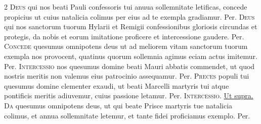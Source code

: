 \begin{multicols*}{2}
{\color{Red} }
\lettrine[lines=2]{\zallmancaps \color{Red} D}{eus} qui nos beati Pauli confessoris tui anuua sollemnitate letificas, concede propicius ut cuius natalicia colimus per eius ad te exempla gradiamur. Per.
{\color{Red} }
\lettrine[lines=2]{\zallmancaps \color{Blue} D}{eus} qui nos sanctorum tuorum Hylarii et Remigii confessionibus gloriosis circundas et protegis, da nobis et eorum imitatione proficere et intercessione gaudere. Per.
{\color{Red} }
\lettrine[lines=2]{\zallmancaps \color{Red} C}{oncede} quesumus omnipotens deus ut ad meliorem vitam sanctorum tuorum exempla nos provocent, quatinus quorum sollemnia agimus eciam actus imitemur. Per.
{\color{Red} }
\lettrine[lines=2]{\zallmancaps \color{Blue} I}{ntercessio} nos quesumus domine beati Mauri abbatis commendet, ut quod nostris meritis non valemus eius patrocinio assequamur. Per.
{\color{Red} }
\lettrine[lines=2]{\zallmancaps \color{Red} P}{reces} populi tui quesumus domine clementer exaudi, ut beati Marcelli martyris tui atque pontificis meritis adiuvemur, cuius passione letamur. Per.
{\color{Red} }
\lettrine[lines=2]{\zallmancaps \color{Blue} I}{ntercessio}. \ul{Ut supra.}
{\color{Red} }
\lettrine[lines=2]{\zallmancaps \color{Red} D}{a} quesumus omnipotens deus, ut qui beate Prisce martyris tue natalicia colimus, et annua sollemnitate letemur, et tante fidei proficiamus exemplo. Per.
{\color{Red} }

\end{multicols*}
